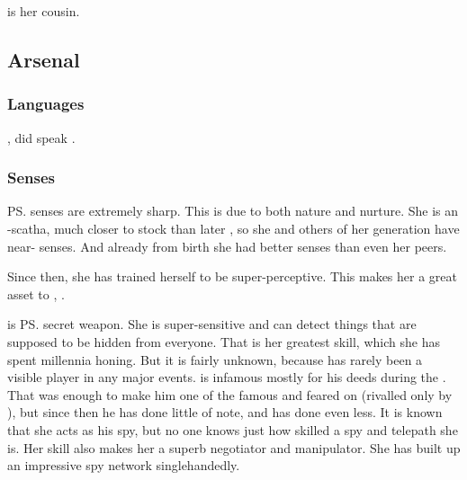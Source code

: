  is her cousin. 









\subsection{Arsenal}





\subsubsection{Languages}
, \Criseis{} did speak \Velcadian. 





\subsubsection{Senses}
\ps{\Criseis} senses are extremely sharp. 
This is due to both nature and nurture. 
She is an \uber-scatha, much closer to \draconic{} stock than later \scathae, so she and others of her generation have near-\draconic{} senses. 
And already from birth she had better senses than even her peers. 

Since then, she has trained herself to be super-perceptive. 
This makes her a great asset to \Ishnaruchaefir, . 

\Criseis is \ps{\Ishnaruchaefir} secret weapon. 
She is super-sensitive and can detect things that are supposed to be hidden from everyone.
That is her greatest skill, which she has spent millennia honing.
But it is fairly unknown, because \Criseis has rarely been a visible player in any major events.
\Ishnaruchaefir is infamous mostly for his deeds during the \secondbanewar.
That was enough to make him one of the famous and feared \dragons on \Miith (rivalled only by \Secherdamon), but since then he has done little of note, and \Criseis has done even less.
It is known that she acts as his spy, but no one knows just how skilled a spy and telepath she is.
Her skill also makes her a superb negotiator and manipulator.
She has built up an impressive spy network singlehandedly.









